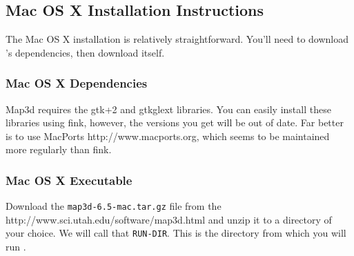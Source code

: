 \subsection{Mac OS X Installation Instructions}
\label{sec:mac-install}

The Mac OS X installation is relatively straightforward.  You'll need to 
download \map{}'s dependencies, then download \map{} itself.

\subsubsection{Mac OS X Dependencies}

Map3d requires the gtk+2 and gtkglext libraries.  You can easily install
these libraries using fink, however, the versions you get will be out of
date.  Far better is to use MacPorts
 {http://www.macports.org},
which seems to be maintained more regularly than fink.


\subsubsection{Mac OS X Executable}

Download the \texttt{map3d-6.5-mac.tar.gz} file from the \map{}
{http://www.sci.utah.edu/software/map3d.html}
and unzip it to a directory of your choice.  We will call that
\texttt{RUN-DIR}. This is the directory from which you will run \map{}.





